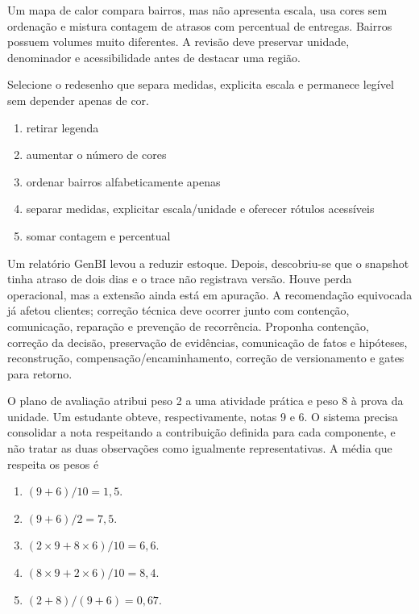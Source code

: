 \documentclass[12pt,a4paper]{article}
\begin{document}

\TextoBase

Um mapa de calor compara bairros, mas não apresenta escala, usa cores sem ordenação e mistura contagem de atrasos com percentual de entregas. Bairros possuem volumes muito diferentes. A revisão deve preservar unidade, denominador e acessibilidade antes de destacar uma região.

\FonteDidatica

\Comando Selecione o redesenho que separa medidas, explicita escala e permanece legível sem depender apenas de cor.

\begin{enumerate}[label=\Alph*)]
  \item retirar legenda
  \item aumentar o número de cores
  \item ordenar bairros alfabeticamente apenas
  \item separar medidas, explicitar escala/unidade e oferecer rótulos acessíveis
  \item somar contagem e percentual
\end{enumerate}

\TextoBase
Um relatório GenBI levou a reduzir estoque. Depois, descobriu-se que o snapshot tinha atraso de dois dias e o trace não registrava versão. Houve perda operacional, mas a extensão ainda está em apuração.
A recomendação equivocada já afetou clientes; correção técnica deve ocorrer junto com contenção, comunicação, reparação e prevenção de recorrência.
\FonteDidatica
\Comando Proponha contenção, correção da decisão, preservação de evidências, comunicação de fatos e hipóteses, reconstrução, compensação/encaminhamento, correção de versionamento e gates para retorno.
\EspacoDiscursiva

\TextoBase O plano de avaliação atribui peso 2 a uma atividade prática e peso 8 à prova da unidade. Um estudante obteve, respectivamente, notas 9 e 6. O sistema precisa consolidar a nota respeitando a contribuição definida para cada componente, e não tratar as duas observações como igualmente representativas.
\FonteDidatica
\Comando A média que respeita os pesos é
\begin{enumerate}[label=\Alph*)]
  \item $(9+6)/10=1{,}5$.
  \item $(9+6)/2=7{,}5$.
  \item $(2\times9+8\times6)/10=6{,}6$.
  \item $(8\times9+2\times6)/10=8{,}4$.
  \item $(2+8)/(9+6)=0{,}67$.
\end{enumerate}
\end{document}
